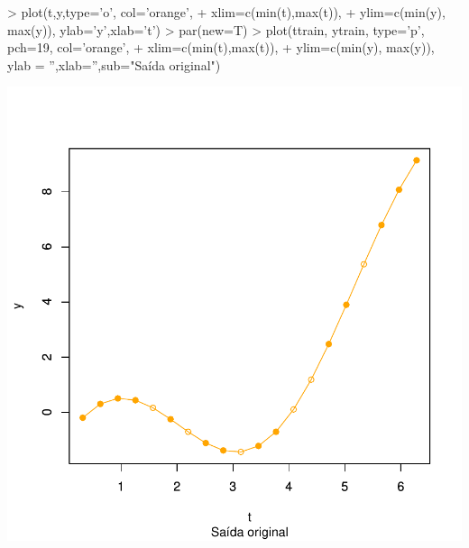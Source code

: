 \documentclass{article}
\begin{document}
\begin{Schunk}
\begin{Sinput}
> plot(t,y,type='o', col='orange', 
+      xlim=c(min(t),max(t)), 
+      ylim=c(min(y), max(y)), ylab='y',xlab='t')
> par(new=T)
> plot(ttrain, ytrain, type='p', pch=19, col='orange',
+      xlim=c(min(t),max(t)), 
+      ylim=c(min(y), max(y)), ylab = '',xlab='',sub="Saída original")
\end{Sinput}
\end{Schunk}
\includegraphics{adaline-009}
\end{document}
